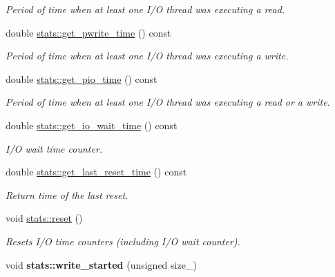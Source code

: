 \begin{CompactItemize}
\begin{CompactList}\small\item\em Period of time when at least one I/O thread was executing a read. \item\end{CompactList}\item 
double \hyperlink{group__iolayer_gd9f7e56d99697abdca76f1ef1ea1ff00}{stats::get\_\-pwrite\_\-time} () const 
\begin{CompactList}\small\item\em Period of time when at least one I/O thread was executing a write. \item\end{CompactList}\item 
double \hyperlink{group__iolayer_g70efd6899577c26be66ad527c6776c44}{stats::get\_\-pio\_\-time} () const 
\begin{CompactList}\small\item\em Period of time when at least one I/O thread was executing a read or a write. \item\end{CompactList}\item 
double \hyperlink{group__iolayer_gfb84d41b01e495224d1e0033386ee55c}{stats::get\_\-io\_\-wait\_\-time} () const 
\begin{CompactList}\small\item\em I/O wait time counter. \item\end{CompactList}\item 
double \hyperlink{group__iolayer_g536af25232d9f9f65e64fbf480b37846}{stats::get\_\-last\_\-reset\_\-time} () const 
\begin{CompactList}\small\item\em Return time of the last reset. \item\end{CompactList}\item 
\hypertarget{group__iolayer_g4b34c969ba2786ae1c29eb01708c2572}{
void \hyperlink{group__iolayer_g4b34c969ba2786ae1c29eb01708c2572}{stats::reset} ()}
\label{group__iolayer_g4b34c969ba2786ae1c29eb01708c2572}

\begin{CompactList}\small\item\em Resets I/O time counters (including I/O wait counter). \item\end{CompactList}\item 
\hypertarget{group__iolayer_gf87dff3952823db0588ead65b2af0b3f}{
void \textbf{stats::write\_\-started} (unsigned size\_\-)}
\label{group__iolayer_gf87dff3952823db0588ead65b2af0b3f}


\end{CompactItemize}
